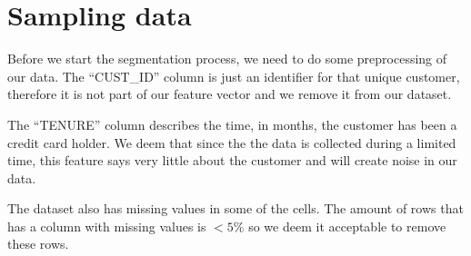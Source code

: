 \section{Sampling data}

Before we start the segmentation process, we need to do some preprocessing of our data. The ``CUST\_ID'' column is just an identifier for that unique customer, therefore it is not part of our feature vector and we remove it from our dataset. 
\par
The ``TENURE'' column describes the time, in months, the customer has been a credit card holder. We deem that since the the data is collected during a limited time, this feature says very little about the customer and will create noise in our data.
\par
The dataset also has missing values in some of the cells. The amount of rows that has a column with missing values is $< 5\%$ so we deem it acceptable to remove these rows.